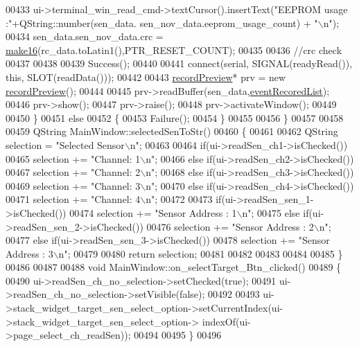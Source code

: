 \begin{DoxyCode}
00433       ui->terminal\_win\_read\_cmd->textCursor().insertText(\textcolor{stringliteral}{"EEPROM usage  :"}+QString::number(sen\_data.
      sen\_nov\_data.eeprom\_usage\_count) + \textcolor{stringliteral}{"\(\backslash\)n"});
00434       sen\_data.sen\_nov\_data.crc = \hyperlink{a00017_afcb06d9f3a6a555df9355af1dfbb4e21}{make16}(rc\_data.toLatin1(),PTR\_RESET\_COUNT);
00435 
00436       \textcolor{comment}{//crc check}
00437 
00438 
00439         Success();
00440 
00441         connect(serial, SIGNAL(readyRead()), \textcolor{keyword}{this}, SLOT(readData()));
00442 
00443         \hyperlink{a00073}{recordPreview}* prv = \textcolor{keyword}{new} \hyperlink{a00073}{recordPreview}();
00444 
00445         prv->readBuffer(sen\_data,\hyperlink{a00017_a773de5ed6b1b522f94b0347ef556137d}{eventRecoredList});
00446         prv->show();
00447         prv->raise();
00448         prv->activateWindow();
00449 
00450     \}
00451     \textcolor{keywordflow}{else}
00452     \{
00453        Failure();
00454     \}
00455 
00456 \}
00457 
00458 
00459 QString MainWindow::selectedSenToStr()
00460 \{
00461 
00462         QString selection = \textcolor{stringliteral}{"Selected Sensor\(\backslash\)n"};
00463 
00464         \textcolor{keywordflow}{if}(ui->readSen\_ch1->isChecked())
00465             selection += \textcolor{stringliteral}{"Channel: 1\(\backslash\)n"};
00466         \textcolor{keywordflow}{else} \textcolor{keywordflow}{if}(ui->readSen\_ch2->isChecked())
00467             selection += \textcolor{stringliteral}{"Channel: 2\(\backslash\)n"};
00468         \textcolor{keywordflow}{else} \textcolor{keywordflow}{if}(ui->readSen\_ch3->isChecked())
00469             selection += \textcolor{stringliteral}{"Channel: 3\(\backslash\)n"};
00470         \textcolor{keywordflow}{else} \textcolor{keywordflow}{if}(ui->readSen\_ch4->isChecked())
00471             selection += \textcolor{stringliteral}{"Channel: 4\(\backslash\)n"};
00472 
00473         \textcolor{keywordflow}{if}(ui->readSen\_sen\_1->isChecked())
00474         selection += \textcolor{stringliteral}{"Sensor Address : 1\(\backslash\)n"};
00475         \textcolor{keywordflow}{else} \textcolor{keywordflow}{if}(ui->readSen\_sen\_2->isChecked())
00476         selection += \textcolor{stringliteral}{"Sensor Address : 2\(\backslash\)n"};
00477         \textcolor{keywordflow}{else} \textcolor{keywordflow}{if}(ui->readSen\_sen\_3->isChecked())
00478         selection += \textcolor{stringliteral}{"Sensor Address : 3\(\backslash\)n"};
00479 
00480         \textcolor{keywordflow}{return} selection;
00481 
00482 
00483 
00484 
00485 \}
00486 
00487 
00488 \textcolor{keywordtype}{void} MainWindow::on\_selectTarget\_Btn\_clicked()
00489 \{
00490     ui->readSen\_ch\_no\_selection->setChecked(\textcolor{keyword}{true});
00491     ui->readSen\_ch\_no\_selection->setVisible(\textcolor{keyword}{false});
00492 
00493     ui->stack\_widget\_target\_sen\_select\_option->setCurrentIndex(ui->stack\_widget\_target\_sen\_select\_option->
      indexOf(ui->page\_select\_ch\_readSen));
00494 
00495 \}
00496 
\end{DoxyCode}
